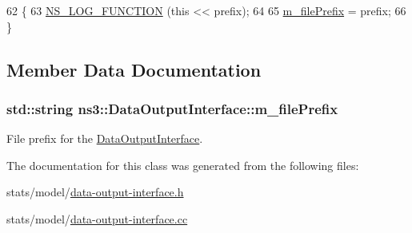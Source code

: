 \begin{DoxyCode}
62 \{
63   \hyperlink{log-macros-disabled_8h_a90b90d5bad1f39cb1b64923ea94c0761}{NS\_LOG\_FUNCTION} (\textcolor{keyword}{this} << prefix);
64 
65   \hyperlink{classns3_1_1DataOutputInterface_a7ee2756b63a5586442419d6a214a3341}{m\_filePrefix} = prefix;
66 \}
\end{DoxyCode}


\subsection{Member Data Documentation}
\subsubsection[{\texorpdfstring{m\+\_\+file\+Prefix}{m_filePrefix}}]{\setlength{\rightskip}{0pt plus 5cm}std\+::string ns3\+::\+Data\+Output\+Interface\+::m\+\_\+file\+Prefix\hspace{0.3cm}{\ttfamily [protected]}}\hypertarget{classns3_1_1DataOutputInterface_a7ee2756b63a5586442419d6a214a3341}{}\label{classns3_1_1DataOutputInterface_a7ee2756b63a5586442419d6a214a3341}


File prefix for the \hyperlink{classns3_1_1DataOutputInterface}{Data\+Output\+Interface}. 



The documentation for this class was generated from the following files\+:\begin{DoxyCompactItemize}
\item 
stats/model/\hyperlink{data-output-interface_8h}{data-\/output-\/interface.\+h}\item 
stats/model/\hyperlink{data-output-interface_8cc}{data-\/output-\/interface.\+cc}\end{DoxyCompactItemize}
